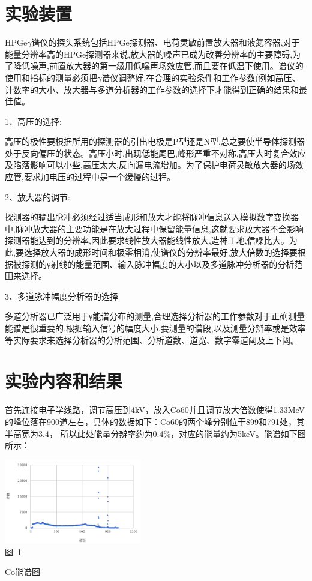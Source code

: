 \documentclass[a4paper,10.0pt,twoside]{npr}
\begin{document}
\begin{multicols}{2}
\section{实验装置}
HPGe$\gamma$谱仪的探头系统包括HPGe探测器、电荷灵敏前置放大器和液氮容器,对于能量分辨率高的HPGe探测器来说,放大器的噪声已成为改善分辨率的主要障碍,为了降低噪声,前置放大器的第一级用低噪声场效应管,而且要在低温下使用。谱仪的使用和指标的测量必须把$\gamma$谱仪调整好,在合理的实验条件和工作参数(例如高压、计数率的大小、放大器与多道分析器的工作参数的选择下才能得到正确的结果和最佳值。

1、高压的选择:

高压的极性要根据所用的探测器的引出电极是P型还是N型,总之要使半导体探测器处于反向偏压的状态。高压小时,出现低能尾巴,峰形严重不对称,高压大时复合效应及陷落影响可以小些,高压太大,反向漏电流增加。为了保护电荷灵敏放大器的场效应管,要求加电压的过程中是一个缓慢的过程。

2、放大器的调节:

探测器的输出脉冲必须经过适当成形和放大才能将脉冲信息送入模拟数字变换器中,脉冲放大器的主要功能是在放大过程中保留能量信息,这就要求放大器不会影响探测器能达到的分辨率,因此要求线性放大器能线性放大,造神工地,信噪比大。为此,要选择放大器的成形时间和极零相消,使谱仪的分辨率最好,放大倍数的选择要根据被探测的γ射线的能量范围、输入脉冲幅度的大小以及多道脉冲分析器的分析范围来选择。

3、多道脉冲幅度分析器的选择

多道分析器已广泛用于γ能谱分布的测量,合理选择分析器的工作参数对于正确测量能谱是很重要的,根据输入信号的幅度大小,要测量的谱段,以及测量分辨率或是效率等实际要求来选择分析器的分析范围、分析道数、道宽、数字零道阈及上下阈。

\section{实验内容和结果}

首先连接电子学线路，调节高压到4kV，放入Co60并且调节放大倍数使得1.33MeV的峰位落在900道左右，具体的数据如下：Co60的两个峰分别位于899和791处，其半高宽为3.4， 所以此处能量分辨率约为0.4\%，对应的能量约为5keV。能谱如下图所示：
\begin{center}
   \includegraphics[width=0.45\textwidth]{1.png}
\\
\xiaowu\song 图~1\begin{minipage}[t]{75mm} \quad Co能谱图\\[-1mm]\wuhao
\end{minipage}
\end{center}


\end{multicols}
\end{document}
